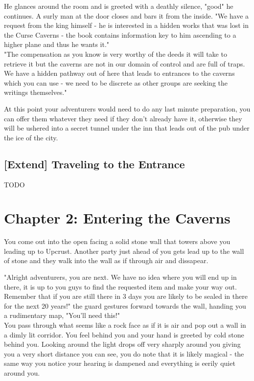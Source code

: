 \documentclass[10pt,twoside,twocolumn]{article}
\begin{document}
\begin{quotebox}
He glances around the room and is greeted with a deathly silence, "good" he continues. A surly man at the door closes and bars it from the inside. "We have a request from the king himself - he is interested in a hidden works that was lost in the Curse Caverns - the book contains information key to him ascending to a higher plane and thus he wants it." \\

"The compensation as you know is very worthy of the deeds it will take to retrieve it but the caverns are not in our domain of control and are full of traps. We have a hidden pathway out of here that leads to entrances to the caverns which you can use - we need to be discrete as other groups are seeking the writings themselves."
\end{quotebox}

At this point your adventurers would need to do any last minute preparation, you can offer them whatever they need if they don't already have it, otherwise they will be ushered into a secret tunnel under the inn that leads out of the pub under the ice of the city. \\

\subsection{[Extend] Traveling to the Entrance}
TODO \\

\section{Chapter 2: Entering the Caverns}
You come out into the open facing a solid stone wall that towers above you leading up to Upcrust. Another party just ahead of you gets lead up to the wall of stone and they walk into the wall as if through air and dissapear.

\begin{quotebox}
"Alright adventurers, you are next. We have no idea where you will end up in there, it is up to you guys to find the requested item and make your way out. Remember that if you are still there in 3 days you are likely to be sealed in there for the next 20 years!" the guard gestures forward towards the wall, handing you a rudimentary map, "You'll need this!" \\

You pass through what seems like a rock face as if it is air and pop out a wall in a dimly lit corridor. You feel behind you and your hand is greeted by cold stone behind you. Looking around the light drops off very sharply around you giving you a very short distance you can see, you do note that it is likely magical - the same way you notice your hearing is dampened and everything is eerily quiet around you.
\end{quotebox}
\end{document}
